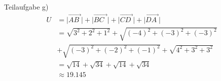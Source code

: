 \begin{exercise}
    Teilaufgabe g)
    \begin{equation*}
      \begin{split}
        U&=\big|\overrightarrow{AB\;}\big|
          +\big|\overrightarrow{BC\;\,}\big|
          +\big|\overrightarrow{CD\;}\big|
          +\big|\overrightarrow{DA\;}\big|
        \\
        &=\sqrt{\num{3}^2+\num{2}^2+\num{1}^2}
         +\sqrt{\left(-\num{4}\right)^2+\left(-\num{3}\right)^2+\left(-\num{3}\right)^2}
        \\
        &+\sqrt{\left(-\num{3}\right)^2+\left(-\num{2}\right)^2+\left(-\num{1}\right)^2}
         +\sqrt{\num{4}^2+\num{3}^2+\num{3}^2}
        \\
        &=\sqrt{\num{14}}
         +\sqrt{\num{34}}
         +\sqrt{\num{14}}
         +\sqrt{\num{34}}
        \\
        &\approx\num{19.145}
      \end{split}
    \end{equation*}
  \fi
\end{exercise}
